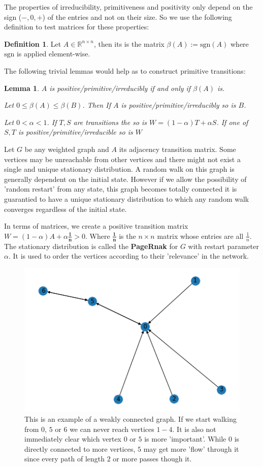 \documentclass[a4paper,10pt]{article}
\newcommand{\R}{\mathbb{R}}
\newcommand{\gt}{>}
\newcommand{\lt}{<}
\theoremstyle{definition}
\newtheorem{mydef}{Definition}[section]
\theoremstyle{remark}
\theoremstyle{plain}
\newtheorem{lemma}{Lemma}[section]
\begin{document}
The properties of irreducibility, primitiveness and positivity only depend on the
sign ($-,0,+$) of the entries and not on their size. So we use the following definition to
test matrices for these properties:

\begin{mydef}
Let $A \in \R^{n \times n}$, then its  is the matrix
$\beta(A) := \text{sgn}(A)$ where $\text{sgn}$ is applied element-wise.
\end{mydef}

The following trivial lemmas would help as to construct primitive transitions:

\begin{lemma}
$A$ is positive/primitive/irreducibly if
and only if $\beta(A)$ is.

Let $0 \leq \beta(A) \leq \beta(B)$.
Then If $A$ is positive/primitive/irreducibly so is $B$.

Let $0 \lt \alpha \lt 1$. If $T,S$ are transitions the so is $W=(1-\alpha)T +
\alpha S$.
If one of $S,T$ is positive/primitive/irreducible so is $W$
\end{lemma}

Let $G$ be any weighted graph and $A$ its adjacency transition matrix. Some vertices may
be unreachable from other vertices and there might not exist a single and
unique stationary distribution. A random walk on this graph is generally
dependent on the initial state.
However if we allow the possibility of 'random restart' from any state, this
graph becomes totally connected it is guarantied to have a unique stationary
distribution to which any random walk converges regardless of the initial state.

In terms of matrices, we create a positive transition matrix $W = (1-\alpha)A +
\alpha \mathbf{\frac{1}{n}} \gt 0$. Where $\mathbf{\frac{1}{n}}$ is the $n
\times n$ matrix whose entries are all $\frac{1}{n}$. The stationary
distribution is called the \textbf{PageRnak} for $G$ with restart parameter
$\alpha$. It is used to order the vertices according to their 'relevance' in the
network.


\begin{figure}[!htb]
  \centering
    \includegraphics[width=0.55\linewidth]{directed_graph_example_unranked.png}
  \caption{This is an example of a weakly connected graph. If we start walking
  from $0$, $5$ or $6$ we can never reach vertices $1-4$. It is also not immediately
  clear which vertex $0$ or $5$ is more 'important'. While $0$ is directly
  connected to more vertices, $5$ may get more 'flow' through it since every
  path of length $2$ or more passes though it.}
  \label{fig:weaklyconnected}
\end{figure}
\end{document}
